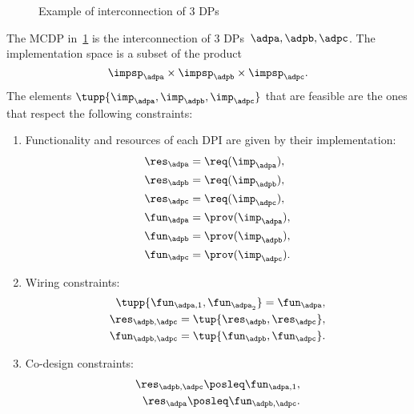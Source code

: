 \begin{figure}
    \centering
    \caption{Example of interconnection of 3 DPs}
    \label{fig:exampleq}
\end{figure}
\begin{example}
    The MCDP in~\cref{fig:exampleq} is the interconnection of 3
    DPs~$\adpa,\adpb,\adpc$.
    The implementation space is a subset of the product
    \begin{equation}
        \impsp_\adpa \times  \impsp_\adpb \times \impsp_\adpc.
    \end{equation}
    The elements $\tupp{\imp_\adpa, \imp_\adpb, \imp_\adpc}$ that are feasible
    are the ones that respect the following constraints:
    \begin{enumerate}
        \item Functionality and resources of each DPI are given by their implementation:
        \begin{align}
            \res_\adpa &= \req(\imp_\adpa), \\
            \res_\adpb &= \req(\imp_\adpb), \\
            \res_\adpc &= \req(\imp_\adpc), \\
            \fun_\adpa &= \prov(\imp_\adpa), \\
            \fun_\adpb &= \prov(\imp_\adpb), \\
            \fun_\adpc &= \prov(\imp_\adpc).
        \end{align}
        \item Wiring constraints:
        \begin{align}
            \tupp{\fun_{\adpa,1}, \fun_{\adpa_2}}  = \fun_\adpa, \\
            \res_{\adpb,\adpc}=\tup{\res_\adpb,\res_\adpc}, \\
            \fun_{\adpb,\adpc}=\tup{\fun_\adpb,\fun_\adpc}.
        \end{align}
        \item Co-design constraints:
        \begin{align}
            \res_{\adpb,\adpc}\posleq \fun_{\adpa,1},\\
            \res_\adpa \posleq \fun_{\adpb,\adpc}.
        \end{align}
    \end{enumerate}
\end{example}


\FloatBarrier\vfill\clearpage %

